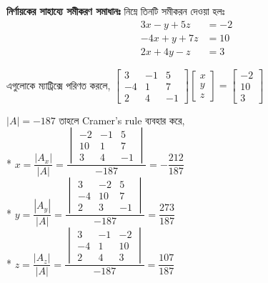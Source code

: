 \documentclass[a4paper,12pt]{article}
\newcommand{\eng}{\textenglish}
\begin{document}
\textbf{নির্ণায়কের সাহায্যে সমীকরণ সমাধানঃ} নিম্নে তিনটি সমীকরন দেওয়া হলঃ
\begin{align*}
    3x-y+5z&=-2\\
-4x+y+7z&=10\\
2x+4y-z&=3
\end{align*}

এগুলোকে ম্যাট্রিক্সে পরিণত করলে,
$\begin{bmatrix}
    3 & -1 & 5\\
    -4 & 1 & 7\\
    2 & 4 & -1
\end{bmatrix} \begin{bmatrix}
    x \\
    y \\
    z 
    \end{bmatrix}=\begin{bmatrix}
        -2 \\
        10 \\
        3 
        \end{bmatrix}$

$|A|=-187$ তাহলে \eng{Cramer's rule} ব্যবহার করে,\\*
$x=\dfrac{|A_x|}{|A|}=\dfrac{\begin{vmatrix}
    -2 & -1 & 5\\
    10 & 1 & 7\\
    3 & 4 & -1
\end{vmatrix}}{-187} = -\dfrac{212}{187}$\\*
$y=\dfrac{|A_y|}{|A|}=\dfrac{\begin{vmatrix}
    3 & -2 & 5\\
    -4 & 10 & 7\\
    2 & 3 & -1
\end{vmatrix}}{-187} = \dfrac{273}{187}$\\*
$z=\dfrac{|A_z|}{|A|}=\dfrac{\begin{vmatrix}
    3 & -1 & -2\\
    -4 & 1 & 10\\
    2 & 4 & 3
\end{vmatrix}}{-187} = \dfrac{107}{187}$
\end{document}
